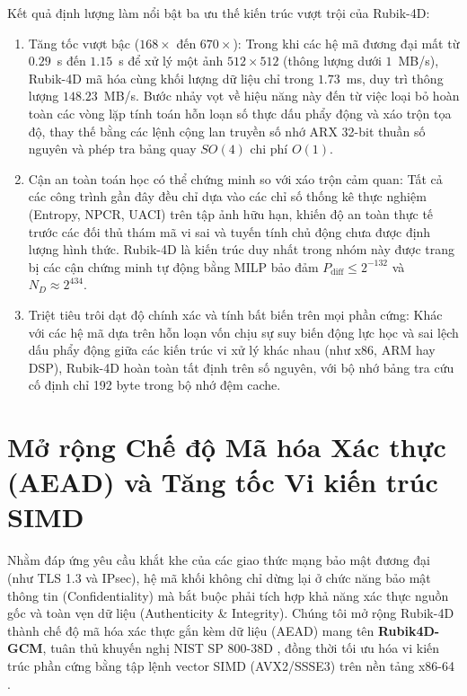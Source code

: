 \documentclass[10pt,twocolumn]{article}
\begin{document}
Kết quả định lượng làm nổi bật ba ưu thế kiến trúc vượt trội của Rubik-4D:
\begin{enumerate}
    \item Tăng tốc vượt bậc ($168\times$ đến $670\times$): Trong khi các hệ mã đương đại mất từ $0.29$~s \cite{nair2024rubik} đến $1.15$~s \cite{zhao2022quantum} để xử lý một ảnh $512 \times 512$ (thông lượng dưới $1$~MB/s), Rubik-4D mã hóa cùng khối lượng dữ liệu chỉ trong $1.73$~ms, duy trì thông lượng $148.23$~MB/s. Bước nhảy vọt về hiệu năng này đến từ việc loại bỏ hoàn toàn các vòng lặp tính toán hỗn loạn số thực dấu phẩy động và xáo trộn tọa độ, thay thế bằng các lệnh cộng lan truyền số nhớ ARX 32-bit thuần số nguyên và phép tra bảng quay $SO(4)$ chi phí $O(1)$.
    \item Cận an toàn toán học có thể chứng minh so với xáo trộn cảm quan: Tất cả các công trình gần đây đều chỉ dựa vào các chỉ số thống kê thực nghiệm (Entropy, NPCR, UACI) trên tập ảnh hữu hạn, khiến độ an toàn thực tế trước các đối thủ thám mã vi sai và tuyến tính chủ động chưa được định lượng hình thức. Rubik-4D là kiến trúc duy nhất trong nhóm này được trang bị các cận chứng minh tự động bằng MILP bảo đảm $P_{\text{diff}} \le 2^{-132}$ và $N_D \approx 2^{434}$.
    \item Triệt tiêu trôi dạt độ chính xác và tính bất biến trên mọi phần cứng: Khác với các hệ mã dựa trên hỗn loạn vốn chịu sự suy biến động lực học và sai lệch dấu phẩy động giữa các kiến trúc vi xử lý khác nhau (như x86, ARM hay DSP), Rubik-4D hoàn toàn tất định trên số nguyên, với bộ nhớ bảng tra cứu cố định chỉ 192 byte trong bộ nhớ đệm cache.
\end{enumerate}

\section{Mở rộng Chế độ Mã hóa Xác thực (AEAD) và Tăng tốc Vi kiến trúc SIMD}
\label{sec:aead_simd_vi}

Nhằm đáp ứng yêu cầu khắt khe của các giao thức mạng bảo mật đương đại (như TLS 1.3 và IPsec), hệ mã khối không chỉ dừng lại ở chức năng bảo mật thông tin (Confidentiality) mà bắt buộc phải tích hợp khả năng xác thực nguồn gốc và toàn vẹn dữ liệu (Authenticity \& Integrity). Chúng tôi mở rộng Rubik-4D thành chế độ mã hóa xác thực gắn kèm dữ liệu (AEAD) mang tên \textbf{Rubik4D-GCM}, tuân thủ khuyến nghị NIST SP 800-38D \cite{dworkin2007gcm,mcgrew2004gcm}, đồng thời tối ưu hóa vi kiến trúc phần cứng bằng tập lệnh vector SIMD (AVX2/SSSE3) trên nền tảng x86-64 \cite{intel2023manual,gueron2010intel}.
\end{document}

